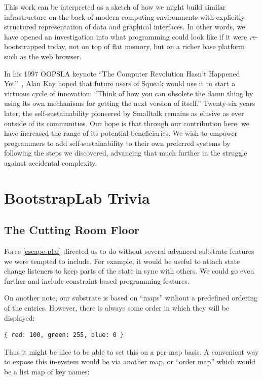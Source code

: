 \documentclass[ twoside,openright,titlepage,numbers=noenddot,headinclude,footinclude,cleardoublepage=empty,abstract=on,
                BCOR=5mm,paper=a4,fontsize=11pt
                ]{scrreprt}
\theoremstyle{definition}
\begin{document}
This work can be interpreted as a sketch of how we might build similar
infrastructure on the back of modern computing environments with
explicitly structured representation of data and graphical interfaces.
In other words, we have opened an investigation into what programming
could look like if it were \emph{re}-bootstrapped today, not on top of
flat memory, but on a richer base platform such as the web browser.

In his 1997 OOPSLA keynote ``The Computer Revolution Hasn't Happened
Yet''~\parencite{CompRev}, Alan Kay hoped that future users of Squeak
would use it to start a virtuous cycle of innovation: ``Think of how you
can obsolete the damn thing by using its own mechanisms for getting the
next version of itself.'' Twenty-six years later, the
self-sustainability pioneered by Smalltalk remains as elusive as ever
outside of its communities. Our hope is that through our contribution
here, we have increased the range of its potential beneficiaries. We
wish to empower programmers to add self-sustainability to their own
preferred systems by following the steps we discovered, advancing that
much further in the struggle against accidental complexity.
\clearpage{}
\appendix
\cleardoublepage
\clearpage{}\hypertarget{bl-trivia}{\chapter{BootstrapLab Trivia}\label{bl-trivia}}

\hypertarget{the-cutting-room-floor}{\section{The Cutting Room Floor}\label{the-cutting-room-floor}}

Force \ref{escape-plaf} directed us to do without several advanced
substrate features we were tempted to include. For example, it would be
useful to attach state change listeners to keep parts of the state in
sync with others. We could go even further and include constraint-based
programming features.

On another note, our substrate is based on ``maps'' without a predefined
ordering of the entries. However, there is always some order in which
they will be displayed:

\begin{verbatim}
{ red: 100, green: 255, blue: 0 }
\end{verbatim}

Thus it might be nice to be able to set this on a per-map basis. A
convenient way to expose this in-system would be via another map, or
``order map'' which would be a list map of key names:
\end{document}
